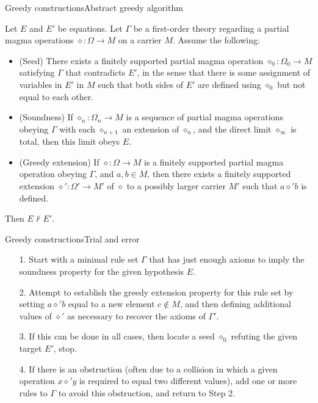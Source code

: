 \documentclass{beamer}
\newcommand{\op}{\diamond}
\begin{document}
\begin{frame}{Greedy constructions}{Abstract greedy algorithm}
	
Let $E$ and $E'$ be equations.
Let $\Gamma$ be a first-order theory regarding a partial magma operations $\op \colon \Omega \to M$ on a carrier $M$.
Assume the following:
\begin{itemize}
	\item (Seed) There exists a finitely supported partial magma operation $\op_0 \colon \Omega_0 \to M$ satisfying $\Gamma$ that contradicts $E'$, in the sense that there is some assignment of variables in $E'$ in $M$ such that both sides of $E'$ are defined using $\op_0$ but not equal to each other.
	\item (Soundness) If $\op_n \colon \Omega_n \to M$ is a sequence of partial magma operations obeying $\Gamma$ with each $\op_{n+1}$ an extension of $\op_n$, and the direct limit $\op_\infty$ is total, then this limit obeys $E$.
	\item (Greedy extension) If $\op \colon \Omega \to M$ is a finitely supported partial magma operation obeying $\Gamma$, and $a,b \in M$, then there exists a finitely supported extension $\op' \colon \Omega' \to M'$ of $\op$ to a possibly larger carrier $M'$ such that $a \op' b$ is defined.
\end{itemize}
Then $E \not\vdash E'$.
	
\end{frame}


\begin{frame}{Greedy constructions}{Trial and error}

\begin{itemize}
	\item[1.] Start with a minimal rule set $\Gamma$ that has just enough axioms to imply the soundness property for the given hypothesis $E$.
	\item[2.] Attempt to establish the greedy extension property for this rule set by setting $a \op' b$ equal to a new element $c \not \in M$, and then defining additional values of $\op'$ as necessary to recover the axioms of $\Gamma'$.
	\item[3.] If this can be done in all cases, then locate a seed $\op_0$ refuting the given target $E'$, stop.
	\item[4.] If there is an obstruction (often due to a collision in which a given operation $x \op' y$ is required to equal two different values), add one or more rules to $\Gamma$ to avoid this obstruction, and return to Step 2.
\end{itemize}

\end{frame}
\end{document}
